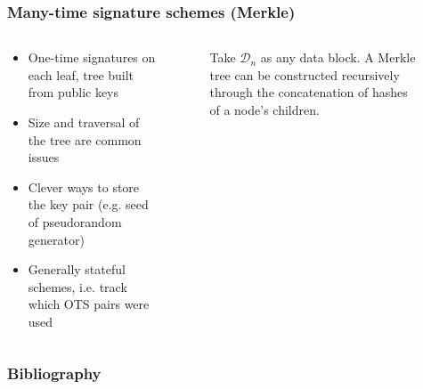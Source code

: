 \documentclass[12pt]{beamer}
\newcommand{\concat}{\, \vert \vert \,}
\newcommand{\hash}[2][]{\mathcal{H}^{#1}(#2)}
\begin{document}
\begin{frame}
  \frametitle{Many-time signature schemes (Merkle)}
  \begin{columns}[T]
    \begin{column}{.45\textwidth}
      \begin{itemize}
        \item One-time signatures on each leaf, tree built from public keys
        \item Size and traversal of the tree are common issues
        \item Clever ways to store the key pair (e.g. seed of pseudorandom generator)
        \item Generally stateful schemes, i.e. track which OTS pairs were used
      \end{itemize}
    \end{column}
    \begin{column}{.4\textwidth}
      \begin{figure}
        \captionsetup{font=scriptsize}
        \caption*{Take $\mathcal{D}_n$ as any data block. A Merkle tree
          can be constructed recursively through the concatenation
          of hashes of a node's children.}
      \end{figure}
    \end{column}
  \end{columns}
\end{frame}

\begin{frame}
  \frametitle{Bibliography}
  
  
\end{frame}
\end{document}
